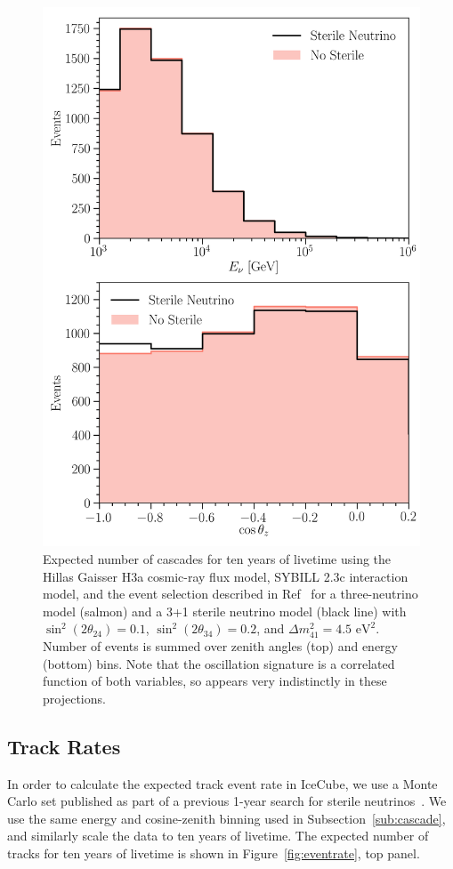 \documentclass[main.tex]{subfiles}
\begin{document}
\begin{figure}
    \centering
    \includegraphics[width=0.75\linewidth]{figures/bothflat.png}
    \caption{Expected number of cascades for ten years of livetime using the Hillas Gaisser H3a cosmic-ray flux model, SYBILL 2.3c interaction model, and the event selection described in Ref~\cite{2018PhDT17N} for a three-neutrino model (salmon) and a 3+1 sterile neutrino model (black line) with $\sin^{2}(2\theta_{24})=0.1$, $\sin^{2}(2\theta_{34})=0.2$, and $\Delta m_{41}^{2}=4.5\text{ eV}^{2}$. Number of events is summed over zenith angles (top) and energy (bottom) bins.  Note that the oscillation signature is a correlated function of both variables, so appears very indistinctly in these projections.}\label{fig:flat}
\end{figure}


\subsection{Track Rates}
In order to calculate the expected track event rate in IceCube, we use a Monte Carlo set published as part of a previous 1-year search for sterile neutrinos~\cite{PhysRevLett.117.071801}. 
We use the same energy and cosine-zenith binning used in Subsection~\ref{sub:cascade}, and similarly scale the data to ten years of livetime. 
The expected number of tracks for ten years of livetime is shown in Figure~\ref{fig:eventrate}, top panel. 
\end{document}
